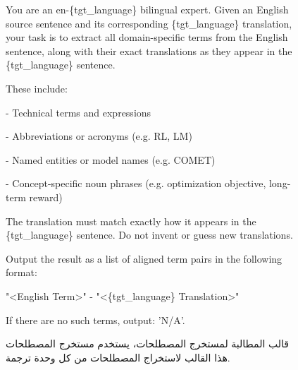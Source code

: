 \documentclass[11pt]{article}
\begin{document}
\begin{figure}[htbp]
    \centering
\begin{tcolorbox}[title=Prompt Template for Terminology Extractor, halign=left]
\small
\ttfamily
You are an en-\{tgt\_language\} bilingual expert. Given an English source sentence and its corresponding \{tgt\_language\} translation, your task is to extract all domain-specific terms from the English sentence, along with their exact translations as they appear in the \{tgt\_language\} sentence.

\vspace{2mm}
These include:

- Technical terms and expressions

- Abbreviations or acronyms (e.g. RL, LM)

- Named entities or model names (e.g. COMET)

- Concept-specific noun phrases (e.g. optimization objective, long-term reward)

\vspace{2mm}
The translation must match exactly how it appears in the \{tgt\_language\} sentence. Do not invent or guess new translations.

Output the result as a list of aligned term pairs in the following format:

"<English Term>" - "<\{tgt\_language\} Translation>"

\vspace{2mm}
If there are no such terms, output: 'N/A'.

\end{tcolorbox}
\caption{قالب المطالبة لمستخرج المصطلحات، يستخدم مستخرج المصطلحات هذا القالب لاستخراج المصطلحات من كل وحدة ترجمة.}
    \label{fig:terminology Extract prompt}
\end{figure}
\end{document}
